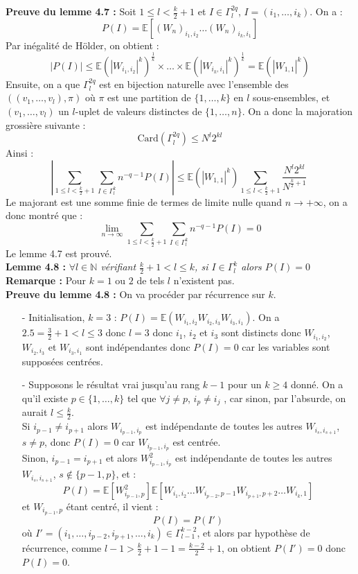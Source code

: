 \documentclass[10pt,a4paper]{article}
\begin{document}
\textbf{Preuve du lemme 4.7 :} Soit $1 \leq l < \frac{k}{2} + 1$ et $I \in \Gamma^{2q}_{l}$, $I = (i_1,\dots,i_k)$. On a :
\[ P(I) = \mathbb{E}[(W_n)_{i_1,i_2}\dots(W_n)_{i_k,i_1}] \] 
Par inégalité de Hölder, on obtient :
\[|P(I)| \leq \mathbb{E}(|W_{i_1,i_2}|^k)^{\frac{1}{k}}\times \dots \times\mathbb{E}(|W_{i_k,i_1}|^k)^{\frac{1}{k}} = \mathbb{E}(|W_{1,1}|^k)\]
Ensuite, on a que $\Gamma^{2q}_{l}$ est en bijection naturelle avec l'ensemble des $((v_1,\dots,v_l),\pi)$ où $\pi$ est une partition de $\{1,\dots,k\}$ en $l$ sous-ensembles, et $(v_1,\dots,v_l)$ un $l$-uplet de valeurs distinctes de $\{1,\dots,n\}$. On a donc la majoration grossière suivante : 
\[\text{Card}(\Gamma^{2q}_{l}) \leq N^l2^{kl}\]
Ainsi : 
\[\left | \sum_{1 \leq l < \frac{k}{2} + 1}\sum_{I \in \Gamma^{k}_{l} } n^{-q-1}P(I) \right | \leq \mathbb{E}(|W_{1,1}|^k) \sum_{1 \leq l < \frac{k}{2} + 1} \frac{N^l2^{kl}}{N^{\frac{k}{2} + 1}} \  \]
Le majorant est une somme finie de termes de limite nulle quand $n \rightarrow +\infty$, on a donc montré que :
\[ \lim_{n \to \infty} \sum_{1 \leq l < \frac{k}{2} + 1}\sum_{I \in \Gamma^{k}_{l} } n^{-q-1}P(I) = 0 \]
Le lemme 4.7 est prouvé.\\

\textbf{Lemme 4.8 :}\textit{ $\forall l \in \mathbb{N}$ vérifiant $\frac{k}{2} + 1 < l \leq k$, si $I \in \Gamma^{k}_{l}$ alors $P(I)=0$}\\

\textbf{Remarque :} Pour $k=1$ ou $2$ de tels $l$ n'existent pas.\\

\textbf{Preuve du lemme 4.8 :} On va procéder par récurrence sur $k$.
\begin{itemize}
\item[-] Initialisation, $k=3$ : $P(I)=\mathbb{E}(W_{i_1,i_2}W_{i_2,i_3}W_{i_3,i_1})$. On a $2.5 = \frac{3}{2} + 1 < l \leq 3$ donc $l=3$ donc $i_1$, $i_2$ et $i_3$ sont distincts donc $W_{i_1,i_2}$, $W_{i_2,i_3}$ et $W_{i_3,i_1}$ sont indépendantes donc $P(I)=0$ car les variables sont supposées centrées.
\item[-] Supposons le résultat vrai jusqu'au rang $k-1$ pour un $k \geq 4$ donné. On a qu'il existe $p \in \{1,\dots,k\}$ tel que $\forall j \neq p$, $i_p \neq i_j$ , car sinon, par l'absurde, on aurait $l \leq \frac{k}{2}$.\\
 Si $i_{p-1} \neq i_{p+1}$ alors $W_{i_{p-1},i_p}$ est indépendante de toutes les autres $W_{i_{s},i_{s+1}}$, $s \neq p$, donc $P(I)=0$ car $W_{i_{p-1},i_p}$ est centrée.\\
 Sinon, $i_{p-1} = i_{p+1}$ et alors $W_{i_{p-1},i_p}^2$ est indépendante de toutes les autres $W_{i_{s},i_{s+1}}$, $s \notin \{p-1,p\} $, et :
 \[P(I)= \mathbb{E}[W_{i_{p-1},p}^2]\mathbb{E}[W_{i_1,i_2}\dots W_{i_{p-2},{p-1}}W_{i_{p+1},{p+2}}\dots W_{i_{k},{1}}] \] et $W_{i_{p-1},p}$ étant centré, il vient :
 \[P(I)=P(I')\]
 où $I'=(i_1,\dots,i_{p-2},i_{p+1},\dots,i_k) \in \Gamma^{k-2}_{l-1}$, et alors par hypothèse de récurrence, comme $l-1 > \frac{k}{2} + 1 - 1 =\frac{k-2}{2}+1$, on obtient $P(I')=0$ donc $P(I)=0$.\\
 
 \end{itemize}
\end{document}
